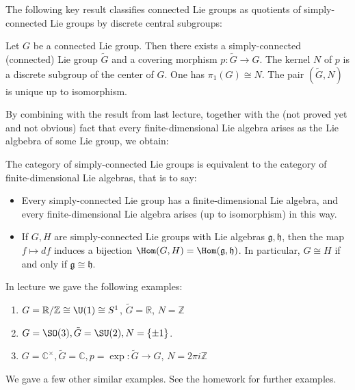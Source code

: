 \documentclass[reqno]{amsart} 
\begin{document}
The following key result classifies connected Lie groups as quotients of simply-connected Lie groups by discrete central subgroups:
\begin{theorem}
  Let $G$ be a connected Lie group.  Then there exists a simply-connected (connected) Lie group $\tilde{G}$ and a covering morphism $p : \tilde{G} \rightarrow G$.  The kernel $N$ of $p$ is a discrete subgroup of the center of $G$.  One has $\pi_1(G) \cong N$.  The pair $(\tilde{G},N)$ is unique up to isomorphism.
\end{theorem}
By combining with the result from last lecture, together with the (not proved yet and not obvious) fact that every finite-dimensional Lie algebra arises as the Lie algbebra of some Lie group, we obtain:
\begin{corollary}
  The category of simply-connected Lie groups is equivalent to the category of finite-dimensional Lie algebras, that is to say:
  \begin{itemize}
  \item Every simply-connected Lie group has a finite-dimensional Lie algebra, and every finite-dimensional Lie algebra arises (up to isomorphism) in this way.
  \item If $G,H$ are simply-connected Lie groups with Lie algebras $\mathfrak{g},\mathfrak{h}$, then the map $f \mapsto d f$ induces a bijection $\Hom(G,H) = \Hom(\mathfrak{g},\mathfrak{h})$.  In particular, $G \cong H$ if and only if $\mathfrak{g} \cong \mathfrak{h}$.
  \end{itemize}
\end{corollary}
In lecture we gave the following examples:
\begin{enumerate}
\item $G = \mathbb{R}/\mathbb{Z} \cong \U(1) \cong S^1$, $\tilde{G} = \mathbb{R}$, $N = \mathbb{Z}$
\item $G = \SO(3), \tilde{G} = \SU(2), N = \{\pm 1\}$.
\item $G = \mathbb{C}^\times, \tilde{G} = \mathbb{C}, p = \exp : \tilde{G} \rightarrow G$, $N = 2 \pi i \mathbb{Z}$
\end{enumerate}
We gave a few other similar examples.  See the homework for further examples.
\end{document}

